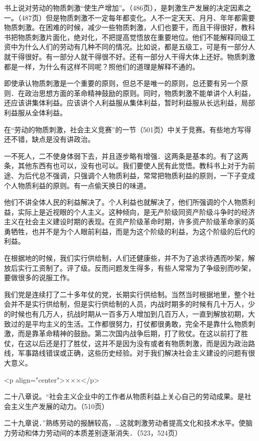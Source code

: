 书上说对劳动的物质刺激“使生产增加”。（486页），是刺激生产发展的决定因素之一。（487页）但是物质刺激不一定每年都变化。人不一定天天、月月、年年都需要物质刺激。在困难的时候，减少一些物质刺激，人们也要干，而且干得很好，教科书把物质刺激片面化，绝对化，不把提高觉悟放在重要地位。他们不能解释同级工资中为什么人们的劳动有几种不同的情况。比如说，都是五级工，可是有一部分人就干得很好。有一部分人就干得很不好。还有一部分人干得大体上还好。物质刺激都是一样，为什么有这样不同呢？照他们的道理是解释不通的。

即使承认物质刺激是一个重要的原则，但总不是唯一的原则，总还要有另一个原则．在政治思想方面的革命精神鼓励的原则。同时，物质刺激不能单讲个人利益，还应该讲集体利益。应该讲个人利益服从集体利益，暂时利益服从长远利益，局部利益服从全体利益。

在“劳动的物质刺激，社会主义竞赛”的一节（501页）中关于竞赛。有些地方写得还不错，缺点是没有讲政治。

一不死人，二不使身体弱下去，并且逐步略有增强．这两条是基本的。有了这两条，其他东西有也可以，没有也可以。我们要使人民有此觉悟。教科书上对于为前途、为后代总不强调，只强调个人物质利益，常常把物质利益的原则，一下子变成个人物质利益的原则。有一点偷天换日的味道。

他们不讲全体人民的利益解决了。个人利益也就解决了，他们所强调的个人物质利益，实际上是近视眼的个人主义。这种倾向，是无产阶级同资产阶级斗争时的经济主义在社会主义建设时期的表现。在资产阶级革命时期，许多资产阶级革命家的英勇牺牲，也并不是为个人眼前利益，而是为这个阶级的利益，为这个阶级的后代的利益。

在根据地的时候，我们实行供给制，人们还健康些，并不为了追求待遇而吵架，解放后实行工资制了。评了级。反而问题发生得多，有些人常常为了争级别而吵架，要做很多的说服工作。

我们党是连续打了二十多年仗的党，长期实行供给制。当然当时根据地里，整个社会并不是实行供给制，但是实行供给制的人员，内战时期多的时候有几十万人，少的时候也有几万人，抗战时期从一百多万人增加到几百万人，一直到解放初期，大致过的是平均主义的生活。工作都很努力，打仗都很勇敢，完全不是靠什么物质刺激，而是靠革命精神的鼓励。第二次国内战争后期，打了败仗。在这以前打了胜仗，在这以后还是打了胜仗，这并不是因为没有或者有物质刺激，而是因为政治路线，军事路线错误或正确，这些历史经验。对于我们解决社会主义建设的问题有很大意义。

<p align="center">×××</p>

二十八章说。“社会主义企业中的工作者从物质利益上关心自己的劳动成果。是社会主义生产发展的动力。（510页）

二十九章说．”熟练劳动的报酬较高，…这就刺激劳动者提高文化和技术水平。使脑力劳动和体力劳动间的本质差别逐渐消失．（523，524页）

